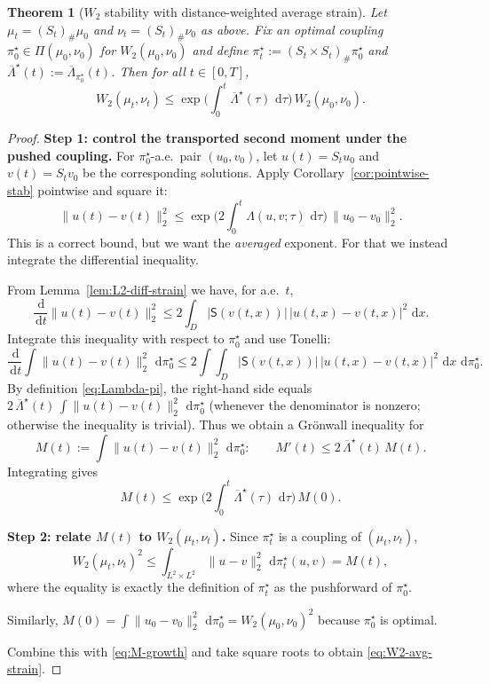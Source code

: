 \documentclass{article}
\numberwithin{equation}{section}
\theoremstyle{plain}
\newtheorem{theorem}{Theorem}[section]
\theoremstyle{definition}
\theoremstyle{remark}
\newcommand{\dd}{\,\mathrm{d}}
\begin{document}
\begin{theorem}[$W_2$ stability with distance-weighted average strain]\label{thm:W2-avg-strain}
Let $\mu_t=(S_t)_\#\mu_0$ and $\nu_t=(S_t)_\#\nu_0$ as above.
Fix an \emph{optimal} coupling $\pi_0^\star\in\Pi(\mu_0,\nu_0)$ for $W_2(\mu_0,\nu_0)$ and define
$\pi_t^\star:=(S_t\times S_t)_\#\pi_0^\star$ and $\overline\Lambda^\star(t):=\overline\Lambda_{\pi_0^\star}(t)$.
Then for all $t\in[0,T]$,
\begin{equation}\label{eq:W2-avg-strain}
W_2(\mu_t,\nu_t)
\le
\exp\Big(\int_0^t \overline\Lambda^\star(\tau)\,\dd\tau\Big)\,W_2(\mu_0,\nu_0).
\end{equation}
\end{theorem}

\begin{proof}
\textbf{Step 1: control the transported second moment under the pushed coupling.}
For $\pi_0^\star$-a.e.\ pair $(u_0,v_0)$, let $u(t)=S_tu_0$ and $v(t)=S_tv_0$ be the corresponding solutions.
Apply Corollary~\ref{cor:pointwise-stab} pointwise and square it:
\[
\|u(t)-v(t)\|_2^2
\le
\exp\Big(2\int_0^t \Lambda(u,v;\tau)\,\dd\tau\Big)\,\|u_0-v_0\|_2^2.
\]
This is a correct bound, but we want the \emph{averaged} exponent. For that we instead integrate the differential inequality.

From Lemma~\ref{lem:L2-diff-strain} we have, for a.e.\ $t$,
\[
\frac{\dd}{\dd t}\|u(t)-v(t)\|_2^2
\le
2\int_D |\mathsf S(v(t,x))|\,|u(t,x)-v(t,x)|^2\,\dd x.
\]
Integrate this inequality with respect to $\pi_0^\star$ and use Tonelli:
\begin{equation}\label{eq:moment-ineq}
\frac{\dd}{\dd t}\int \|u(t)-v(t)\|_2^2\,\dd\pi_0^\star
\le
2\int \int_D |\mathsf S(v(t,x))|\,|u(t,x)-v(t,x)|^2\,\dd x\,\dd\pi_0^\star.
\end{equation}
By definition \eqref{eq:Lambda-pi}, the right-hand side equals
$2\,\overline\Lambda^\star(t)\,\int \|u(t)-v(t)\|_2^2\,\dd\pi_0^\star$ (whenever the denominator is nonzero; otherwise the inequality is trivial).
Thus we obtain a Gr\"onwall inequality for
\[
M(t):=\int \|u(t)-v(t)\|_2^2\,\dd\pi_0^\star:
\qquad
M'(t)\le 2\,\overline\Lambda^\star(t)\,M(t).
\]
Integrating gives
\begin{equation}\label{eq:M-growth}
M(t)\le \exp\Big(2\int_0^t \overline\Lambda^\star(\tau)\,\dd\tau\Big)\,M(0).
\end{equation}

\textbf{Step 2: relate $M(t)$ to $W_2(\mu_t,\nu_t)$.}
Since $\pi_t^\star$ is a coupling of $(\mu_t,\nu_t)$,
\[
W_2(\mu_t,\nu_t)^2 \le \int_{L^2\times L^2}\|u-v\|_2^2\,\dd\pi_t^\star(u,v)=M(t),
\]
where the equality is exactly the definition of $\pi_t^\star$ as the pushforward of $\pi_0^\star$.

Similarly, $M(0)=\int\|u_0-v_0\|_2^2\,\dd\pi_0^\star = W_2(\mu_0,\nu_0)^2$ because $\pi_0^\star$ is optimal.

Combine this with \eqref{eq:M-growth} and take square roots to obtain \eqref{eq:W2-avg-strain}.
\end{proof}
\end{document}
